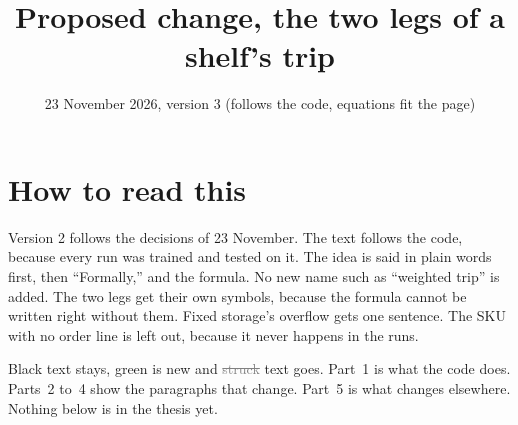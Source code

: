 \documentclass[11pt,a4paper]{article}
\title{Proposed change, the two legs of a shelf's trip}
\date{23 November 2026, version 3 (follows the code, equations fit the page)}
\newcommand{\new}[1]{\textcolor{newc}{#1}}
\newcommand{\old}[1]{\textcolor{gray}{\sout{#1}}}
\begin{document}
\sloppy
\maketitle

\section*{How to read this}
Version 2 follows the decisions of 23 November. The text follows the code,
because every run was trained and tested on it. The idea is said in plain
words first, then ``Formally,'' and the formula. No new name such as
``weighted trip'' is added. The two legs get their own symbols, because the
formula cannot be written right without them. Fixed storage's overflow gets
one sentence. The SKU with no order line is left out, because it never
happens in the runs.

Black text stays, \new{green} is new and \old{struck} text goes. Part~1 is
what the code does. Parts~2 to~4 show the paragraphs that change. Part~5 is
what changes elsewhere. Nothing below is in the thesis yet.
\end{document}
